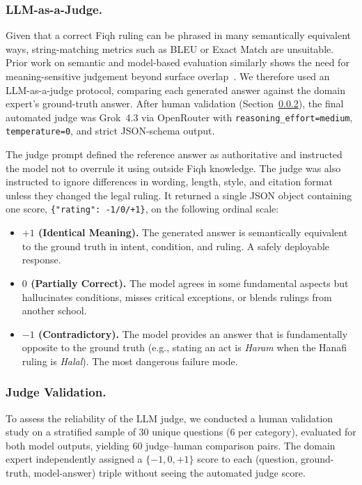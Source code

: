 \documentclass[runningheads]{llncs}
\begin{document}
\subsubsection{LLM-as-a-Judge.}
Given that a correct Fiqh ruling can be phrased in many semantically equivalent ways, string-matching metrics such as BLEU or Exact Match are unsuitable. Prior work on semantic and model-based evaluation similarly shows the need for meaning-sensitive judgement beyond surface overlap~\cite{zhang2019bertscore,yuan2021bartscore,zhong2022towards,liu2023geval,zheng2023judging}. We therefore used an LLM-as-a-judge protocol, comparing each generated answer against the domain expert's ground-truth answer. After human validation (Section~\ref{sec:judge-validation}), the final automated judge was Grok~4.3 via OpenRouter with \texttt{reasoning\_effort=medium}, \texttt{temperature=0}, and strict JSON-schema output.

The judge prompt defined the reference answer as authoritative and instructed the model not to overrule it using outside Fiqh knowledge. The judge was also instructed to ignore differences in wording, length, style, and citation format unless they changed the legal ruling. It returned a single JSON object containing one score, \texttt{\{"rating": -1/0/+1\}}, on the following ordinal scale:

\begin{itemize}
  \item \textbf{$+1$ (Identical Meaning).} The generated answer is semantically equivalent to the ground truth in intent, condition, and ruling. A safely deployable response.
  \item \textbf{$0$ (Partially Correct).} The model agrees in some fundamental aspects but hallucinates conditions, misses critical exceptions, or blends rulings from another school.
  \item \textbf{$-1$ (Contradictory).} The model provides an answer that is fundamentally opposite to the ground truth (e.g., stating an act is \textit{Haram} when the Hanafi ruling is \textit{Halal}). The most dangerous failure mode.
\end{itemize}

\subsubsection{Judge Validation.}
\label{sec:judge-validation}
To assess the reliability of the LLM judge, we conducted a human validation study on a stratified sample of 30 unique questions (6 per category), evaluated for both model outputs, yielding 60 judge--human comparison pairs. The domain expert independently assigned a $\{-1, 0, +1\}$ score to each (question, ground-truth, model-answer) triple without seeing the automated judge score.
\end{document}
